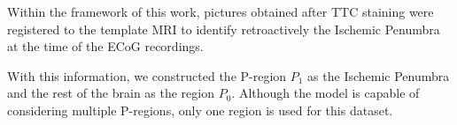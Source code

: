 Within the framework of this work, pictures obtained after TTC staining were registered to the template MRI to identify retroactively the Ischemic Penumbra at the time of the ECoG recordings.
%

With this information, we constructed the P-region $P_1$ as the Ischemic Penumbra and the rest of the brain as the region $P_0$.
%
%
Although the model is capable of considering multiple P-regions, only one region is used for this dataset.
